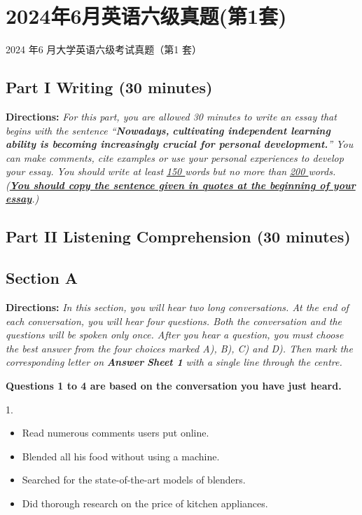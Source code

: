 \documentclass[UTF8,11pt]{ctexart}
\begin{document}
\section*{2024年6月英语六级真题(第1套)}
2024 年6 月大学英语六级考试真题（第1 套）


\subsection*{\textbf{Part I Writing} \textbf{(30 minutes)}}


\textbf{Directions:} \textit{For this part, you are allowed 30 minutes to write an essay that begins with the sentence “}\textbf{\textit{Nowadays,}} \textbf{\textit{cultivating independent learning ability is becoming increasingly crucial for personal development.}}\textit{” You can make} \textit{comments, cite examples or use your personal experiences to develop your essay. You should write at least }\textit{\uline{150 }}\textit{words} \textit{but no more than }\textit{\uline{200 }}\textit{words. (}\textbf{\textit{\uline{You should copy the sentence given in quotes at the beginning of your essay}}}\textit{.)}


\subsection*{\textbf{Part II} \textbf{Listening Comprehension} \textbf{(30 minutes)}}


\subsection*{\textbf{Section A}}


\textbf{Directions:} \textit{In this section, you will hear two long conversations. At the end of each conversation, you will hear four} \textit{questions. Both the conversation and the questions will be spoken only once. After you hear a question, you must} \textit{choose the best answer from the four choices marked A), B), C) and D). Then mark the corresponding letter on }\textbf{\textit{Answer}} \textbf{\textit{Sheet 1}}\textit{ with a single line through the centre.}


\textbf{Questions 1 to 4 are based on the conversation you have just heard.}


1.


\begin{itemize}[leftmargin=2em,itemsep=.2em,topsep=.4em]\item[A.] Read numerous comments users put online.
\item[B.] Blended all his food without using a machine.
\item[C.] Searched for the state-of-the-art models of blenders.
\item[D.] Did thorough research on the price of kitchen appliances.
\end{itemize}
\end{document}
